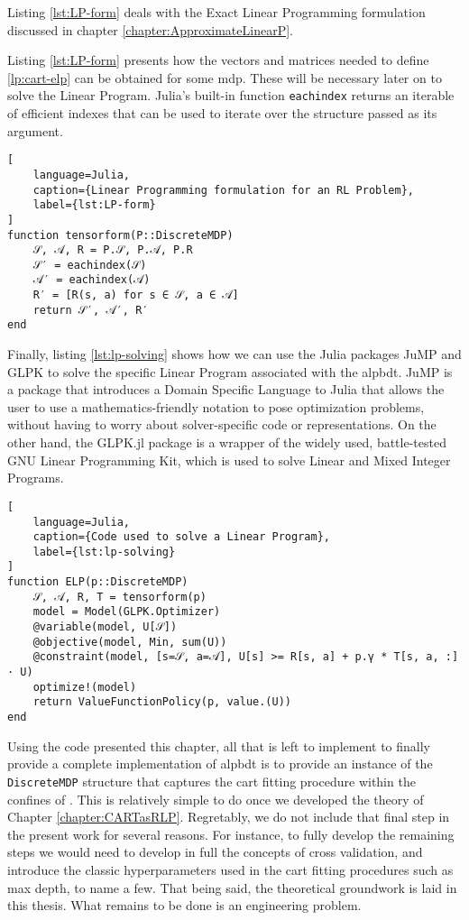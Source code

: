 Listing \ref{lst:LP-form} deals with the Exact Linear Programming formulation
discussed in chapter \ref{chapter:ApproximateLinearP}.

Listing \ref{lst:LP-form} presents how the vectors and matrices needed to define
\eqref{lp:cart-elp} can be obtained for some \ac{mdp}. These will be necessary
later on to solve the Linear Program. Julia's built-in function
\lstinline{eachindex} returns an iterable of efficient indexes that can be used
to iterate over the structure passed as its argument.

\begin{lstlisting}[
    language=Julia,
    caption={Linear Programming formulation for an RL Problem},
    label={lst:LP-form}
]
function tensorform(P::DiscreteMDP)
    𝒮, 𝒜, R = P.𝒮, P.𝒜, P.R
    𝒮′ = eachindex(𝒮)
    𝒜′ = eachindex(𝒜)
    R′ = [R(s, a) for s ∈ 𝒮, a ∈ 𝒜]
    return 𝒮′, 𝒜′, R′
end
\end{lstlisting}

Finally, listing \ref{lst:lp-solving} shows how we can use the Julia packages
JuMP and GLPK to solve the specific Linear Program associated with the
\ac{alpbdt}. JuMP is a package that introduces a Domain Specific Language to
Julia that allows the user to use a mathematics-friendly notation to pose
optimization problems, without having to worry about solver-specific code or
representations. On the other hand, the GLPK.jl package is a wrapper of the
widely used, battle-tested GNU Linear Programming Kit, which is used to solve
Linear and Mixed Integer Programs.

\begin{lstlisting}[
    language=Julia,
    caption={Code used to solve a Linear Program},
    label={lst:lp-solving}
]
function ELP(p::DiscreteMDP)
    𝒮, 𝒜, R, T = tensorform(p)
    model = Model(GLPK.Optimizer)
    @variable(model, U[𝒮])
    @objective(model, Min, sum(U))
    @constraint(model, [s=𝒮, a=𝒜], U[s] >= R[s, a] + p.γ * T[s, a, :] · U)
    optimize!(model)
    return ValueFunctionPolicy(p, value.(U))
end
\end{lstlisting}

Using the code presented this chapter, all that is left to implement to finally
provide a complete implementation of \ac{alpbdt} is to provide an instance of
the \lstinline{DiscreteMDP} structure that captures the \ac{cart} fitting
procedure within the confines of . This is relatively simple to do once
we developed the theory of Chapter \ref{chapter:CARTasRLP}. Regretably, we do
not include that final step in the present work for several reasons. For
instance, to fully develop the remaining steps we would need to develop in full
the concepts of cross validation, and introduce the classic hyperparameters used
in the \ac{cart} fitting procedures such as max depth, to name a few. That being
said, the theoretical groundwork is laid in this thesis. What remains to be done
is an engineering problem.